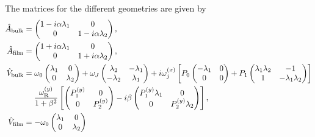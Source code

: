 The matrices for the different geometries are given by
\begin{subequations}
\begin{align}
    \hat{A}_{\text{bulk}} &=
    \begin{pmatrix}
     1-i\alpha\lambda_1 & 0 \\
     0 & 1-i\alpha\lambda_2
    \end{pmatrix}, \label{eq:Abulk}\\
    \hat{A}_{\text{film}} &=
    \begin{pmatrix}
     1+i\alpha\lambda_1 & 0 \\
     0 & 1+i\alpha\lambda_2
    \end{pmatrix}, \label{eq:Afilm}\\
    \nonumber\hat{V}_{\text{bulk}} &=
    \omega_0\begin{pmatrix}
     \lambda_1 & 0 \\
     0 & \lambda_2
    \end{pmatrix}
    + \omega_J \begin{pmatrix}
     \lambda_2 & -\lambda_1 \\
     -\lambda_2 & \lambda_1
    \end{pmatrix}
    + i\omega_j^{(x)}\left[P_0
    \begin{pmatrix}
     -\lambda_1 & 0 \\
     0 & 0
    \end{pmatrix}
    + P_1
    \begin{pmatrix}
     \lambda_1\lambda_2 & -1 \\
     1 & -\lambda_1\lambda_2
    \end{pmatrix}\right] \\
    &\hspace{4.5mm} \frac{\omega_{\text{R}}^{(y)}}{1+\beta^2}\left[
    \begin{pmatrix}
     P_1^{(y)} & 0 \\
     0 & P_2^{(y)}
    \end{pmatrix}
    - i \beta
    \begin{pmatrix}
     P_1^{(y)}\lambda_1 & 0 \\
     0 & P_2^{(y)}\lambda_2
    \end{pmatrix}\right], \label{eq:Vbulk}\\
    \nonumber\hat{V}_{\text{film}} &=
    -\omega_0\begin{pmatrix}
     \lambda_1 & 0 \\
     0 & \lambda_2
    \end{pmatrix}

\end{align}
\end{subequations}
